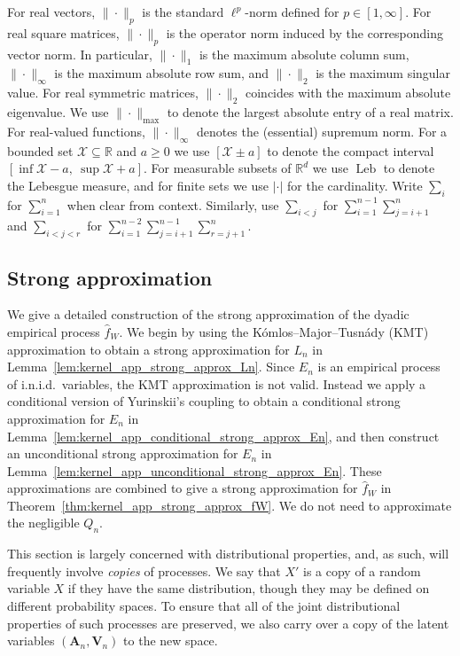 \documentclass[11pt,lof]{puthesis}
\newcommand{\R}{\ensuremath{\mathbb{R}}}
\newcommand{\bA}{\ensuremath{\mathbf{A}}}
\newcommand{\bV}{\ensuremath{\mathbf{V}}}
\newcommand{\cX}{\ensuremath{\mathcal{X}}}
\DeclareMathOperator{\Leb}{Leb}
\theoremstyle{break}
\theoremstyle{proof}
\begin{document}
For real vectors,
$\|\cdot\|_p$ is the standard $\ell^p$-norm defined for $p \in [1, \infty]$.
For real square matrices,
$\|\cdot\|_p$ is the operator
norm induced by the corresponding vector norm.
In particular,
$\|\cdot\|_1$
is the maximum absolute column sum,
$\|\cdot\|_\infty$
is the maximum absolute row sum,
and $\|\cdot\|_2$
is the maximum singular value.
For real symmetric matrices,
$\|\cdot\|_2$
coincides with the maximum absolute eigenvalue.
We use $\|\cdot\|_{\max}$
to denote the largest absolute entry of a real matrix.
For real-valued functions,
$\|\cdot\|_\infty$
denotes the (essential) supremum norm.
For a bounded set $\cX \subseteq \R$ and $a \geq 0$
we use $[\cX \pm a]$ to denote the compact interval
$[\inf \cX - a, \ \sup \cX + a]$.
For measurable subsets of $\R^d$
we use $\Leb$ to denote the Lebesgue measure,
and for finite sets we use $|\cdot|$
for the cardinality.
Write $\sum_i$
for $\sum_{i=1}^n$
when clear from context.
Similarly, use $\sum_{i<j}$
for $\sum_{i=1}^{n-1} \sum_{j=i+1}^n$
and $\sum_{i<j<r}$
for $\sum_{i=1}^{n-2} \sum_{j=i+1}^{n-1} \sum_{r=j+1}^n$.

\subsection{Strong approximation}
\label{sec:kernel_app_strong_approx}

We give a detailed construction of the
strong approximation of the dyadic empirical process $\hat f_W$.
We begin by using the
K{\'o}mlos--Major--Tusn{\'a}dy (KMT) approximation
to obtain a strong approximation for $L_n$
in Lemma~\ref{lem:kernel_app_strong_approx_Ln}.
Since $E_n$ is an empirical process of i.n.i.d.\ variables,
the KMT approximation is not valid.
Instead we apply a conditional version of
Yurinskii's coupling to obtain a
conditional strong approximation for $E_n$
in Lemma~\ref{lem:kernel_app_conditional_strong_approx_En},
and then construct an unconditional
strong approximation for $E_n$
in Lemma~\ref{lem:kernel_app_unconditional_strong_approx_En}.
These approximations are combined to give a
strong approximation for $\hat f_W$
in Theorem~\ref{thm:kernel_app_strong_approx_fW}.
We do not need to approximate
the negligible $Q_n$.

This section is largely concerned with
distributional properties,
and, as such, will frequently involve
\emph{copies} of processes.
We say that $X'$ is a copy of a random variable $X$
if they have the same distribution,
though they may be defined on different probability spaces.
To ensure that all of the joint distributional properties of
such processes are preserved,
we also carry over a copy of the latent variables
$(\bA_n, \bV_n)$
to the new space.
\end{document}
